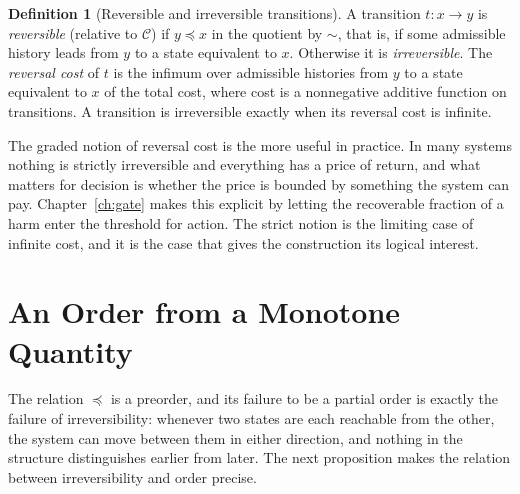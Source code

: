 \documentclass[11pt,twoside,openright]{book}
\theoremstyle{plain}
\theoremstyle{definition}
\newtheorem{definition}[theorem]{Definition}
\theoremstyle{remark}
\begin{document}
\begin{definition}[Reversible and irreversible transitions]
A transition $t:x\to y$ is \emph{reversible} (relative to $\mathcal{C}$) if $y\preceq x$ in the quotient by $\sim$, that is, if some admissible history leads from $y$ to a state equivalent to $x$. Otherwise it is \emph{irreversible}. The \emph{reversal cost} of $t$ is the infimum over admissible histories from $y$ to a state equivalent to $x$ of the total cost, where cost is a nonnegative additive function on transitions. A transition is irreversible exactly when its reversal cost is infinite.
\end{definition}

The graded notion of reversal cost is the more useful in practice. In many systems nothing is strictly irreversible and everything has a price of return, and what matters for decision is whether the price is bounded by something the system can pay. Chapter~\ref{ch:gate} makes this explicit by letting the recoverable fraction of a harm enter the threshold for action. The strict notion is the limiting case of infinite cost, and it is the case that gives the construction its logical interest.

\section{An Order from a Monotone Quantity}

The relation $\preceq$ is a preorder, and its failure to be a partial order is exactly the failure of irreversibility: whenever two states are each reachable from the other, the system can move between them in either direction, and nothing in the structure distinguishes earlier from later. The next proposition makes the relation between irreversibility and order precise.
\end{document}
